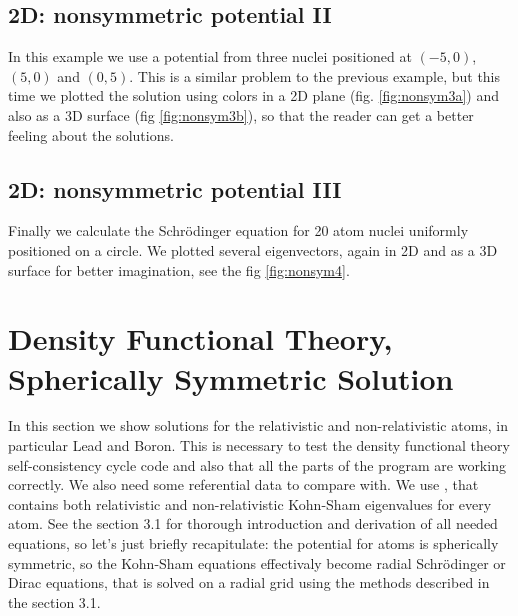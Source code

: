 
\subsection{2D: nonsymmetric potential II}

In this example we use a potential from three nuclei positioned at $(-5, 0)$,
$(5, 0)$ and $(0, 5)$. This is a similar problem to the previous example, but
this time we plotted the solution using colors in a 2D plane (fig.
\ref{fig:nonsym3a}) and also as a 3D surface (fig \ref{fig:nonsym3b}), so that
the reader can get a better feeling about the solutions.



\subsection{2D: nonsymmetric potential III}

Finally we calculate the Schr\"odinger equation for 20 atom nuclei uniformly
positioned on a circle. We plotted several eigenvectors, again in 2D and as a
3D surface for better imagination, see the fig \ref{fig:nonsym4}.


\section{Density Functional Theory, Spherically Symmetric Solution}

In this section we show solutions for the relativistic and non-relativistic
atoms, in particular Lead and Boron. This is necessary to test the density
functional theory self-consistency cycle code and also that all the parts of
the program are working correctly. We also need some referential data to
compare with. We use \cite{nist}, that contains both relativistic and
non-relativistic Kohn-Sham eigenvalues for every atom. See the section 3.1 for
thorough introduction and derivation of all needed equations, so let's just
briefly recapitulate: the potential for atoms is spherically symmetric, so the
Kohn-Sham equations effectivaly become radial Schr\"odinger or Dirac
equations, that is solved on a radial grid using the methods described in the
section 3.1.

